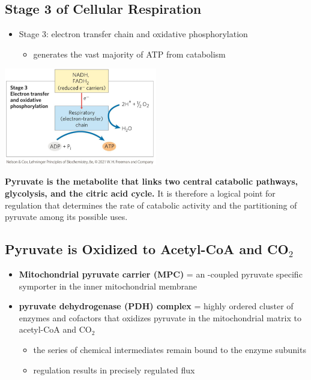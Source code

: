 \documentclass[10pt]{article}
\newcommand{\proton}{\text{H$^+$}}
\begin{document}
\subsection*{Stage 3 of Cellular Respiration}
\begin{itemize}
	\item Stage 3: electron transfer chain and oxidative phosphorylation
	\begin{itemize}
        \item generates the vast majority of ATP from catabolism
    \end{itemize}
\end{itemize}
\begin{center} 
	\includegraphics*[width=0.5\textwidth]{L3_3.png}
\end{center}
\textbf{Pyruvate is the metabolite that links two central catabolic pathways, glycolysis, and the citric acid cycle.}  It is therefore a logical point for regulation that determines the rate of catabolic activity and the partitioning of pyruvate among its possible uses.

\subsection*{Pyruvate is Oxidized to Acetyl-CoA and CO$_2$}
\begin{itemize}
	\item \textbf{Mitochondrial pyruvate carrier (MPC)} = an \proton-coupled pyruvate specific symporter in the inner mitochondrial membrane
	\item \textbf{pyruvate dehydrogenase (PDH) complex} = highly ordered cluster of enzymes and cofactors that oxidizes pyruvate in the mitochondrial matrix to acetyl-CoA and CO$_2$
	\begin{itemize}
        \item the series of chemical intermediates remain bound to the enzyme subunits
        \item regulation results in precisely regulated flux
    \end{itemize}
\end{itemize}
\end{document}
